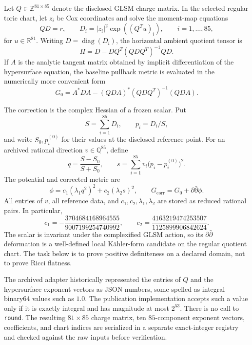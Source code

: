 \documentclass[11pt]{article}
\newcommand{\ddbar}{\partial\bar\partial}
\newcommand{\Gc}{G_{\mathrm{corr}}}
\newcommand{\Gzero}{G_0}
\newcommand{\QQ}{\mathbb{Q}}
\begin{document}
Let $Q\in\mathbb Z^{81\times85}$ denote the disclosed GLSM charge matrix.  In
the selected regular toric chart, let $z_i$ be Cox coordinates and solve the
moment-map equations
\begin{equation}\label{eq:moment}
 QD=r,\qquad D_i=|z_i|^2\exp((Q^Tu)_i),\qquad i=1,\ldots,85,
\end{equation}
for $u\in\mathbb R^{81}$.  Writing $D=\operatorname{diag}(D_i)$, the horizontal
ambient quotient tensor is
\begin{equation}\label{eq:quotient}
 H=D-DQ^T(QDQ^T)^{-1}QD.
\end{equation}
If $A$ is the analytic tangent matrix obtained by implicit differentiation of
the hypersurface equation, the baseline pullback metric is evaluated in the
numerically more convenient form
\begin{equation}\label{eq:pullback}
 \Gzero=A^*DA-(QDA)^*(QDQ^T)^{-1}(QDA).
\end{equation}

The correction is the complex Hessian of a frozen scalar.  Put
\begin{equation}
 S=\sum_{i=1}^{85}D_i,\qquad p_i=D_i/S,
\end{equation}
and write $S_0,p_i^{(0)}$ for their values at the disclosed reference point.
For an archived rational direction $v\in\QQ^{85}$, define
\begin{equation}
 q=\frac{S-S_0}{S+S_0},\qquad
 s=\sum_{i=1}^{85}v_i\bigl(p_i-p_i^{(0)}\bigr)^2.
\end{equation}
The potential and corrected metric are
\begin{equation}\label{eq:correction}
 \phi=c_1(\lambda_1q^2)^2+c_2(\lambda_2s)^2,
 \qquad \Gc=\Gzero+\ddbar\phi.
\end{equation}
All entries of $v$, all reference data, and $c_1,c_2,\lambda_1,\lambda_2$ are
stored as reduced rational pairs.  In particular,
\begin{equation}
 c_1=-\frac{3704684168964555}{9007199254740992},\qquad
 c_2=\frac{4163219474253507}{1125899906842624}.
\end{equation}
The scalar is invariant under the complexified GLSM action, so its
$\ddbar$ deformation is a well-defined local K\"ahler-form candidate on the
regular quotient chart.  The task below is to prove positive definiteness on
a declared domain, not to prove Ricci flatness.

The archived adapter historically represented the entries of $Q$ and the
hypersurface exponent vectors as JSON numbers, some spelled as integral
binary64 values such as $1.0$.  The publication implementation accepts such a
value only if it is exactly integral and has magnitude at most $2^{53}$.
There is no call to \texttt{round}.  The resulting $81\times85$ charge matrix,
ten $85$-component exponent vectors, coefficients, and chart indices are
serialized in a separate exact-integer registry and checked against the raw
inputs before verification.
\end{document}
